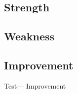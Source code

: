\documentclass[../main]{subfiles}
\begin{document}
\subsection{Strength}

\subsection{Weakness}

\subsection{Improvement}
Test--- Improvement
\end{document}
